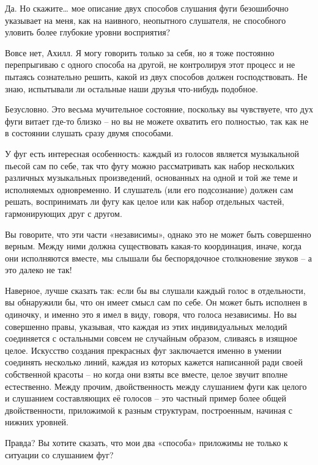 \documentclass[../main.tex]{subfiles}
\begin{document}
\begin{dialogue}
 Да. Но скажите\ldots{} мое описание двух способов слушания фуги безошибочно указывает на меня, как на наивного, неопытного слушателя, не способного уловить более глубокие уровни восприятия?

 Вовсе нет, Ахилл. Я могу говорить только за себя, но я тоже постоянно перепрыгиваю с одного способа на другой, не контролируя этот процесс и не пытаясь сознательно решить, какой из двух способов должен господствовать. Не знаю, испытывали ли остальные наши друзья что-нибудь подобное.

 Безусловно. Это весьма мучительное состояние, поскольку вы чувствуете, что дух фуги витает где-то близко \--- но вы не можете охватить его полностью, так как не в состоянии слушать сразу двумя способами.

 У фуг есть интересная особенность: каждый из голосов является музыкальной пьесой сам по себе, так что фугу можно рассматривать как набор нескольких различных музыкальных произведений, основанных на одной и той же теме и исполняемых одновременно. И слушатель (или его подсознание) должен сам решать, воспринимать ли фугу как целое или как набор отдельных частей, гармонирующих друг с другом.

 Вы говорите, что эти части «независимы», однако это не может быть совершенно верным. Между ними должна существовать какая-то координация, иначе, когда они исполняются вместе, мы слышали бы беспорядочное столкновение звуков \--- а это далеко не так!

 Наверное, лучше сказать так: если бы вы слушали каждый голос в отдельности, вы обнаружили бы, что он имеет смысл сам по себе. Он может быть исполнен в одиночку, и именно это я имел в виду, говоря, что голоса независимы. Но вы совершенно правы, указывая, что каждая из этих индивидуальных мелодий соединяется с остальными совсем не случайным образом, сливаясь в изящное целое. Искусство создания прекрасных фуг заключается именно в умении соединять несколько линий, каждая из которых кажется написанной ради своей собственной красоты \--- но когда они взяты все вместе, целое звучит вполне естественно. Между прочим, двойственность между слушанием фуги как целого и слушанием составляющих её голосов \--- это частный пример более общей двойственности, приложимой к разным структурам, построенным, начиная с нижних уровней.

 Правда? Вы хотите сказать, что мои два «способа» приложимы не только к ситуации со слушанием фуг?


\end{dialogue}
\end{document}
